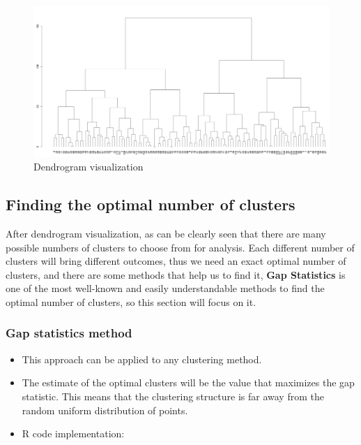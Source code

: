    \begin{figure}[H]
        \centering
        \includegraphics[scale=0.3]{graphics/dummy/dendrogram/dendrogram1.png}
        \caption{Dendrogram visualization }
    \end{figure} 

\subsection{Finding the optimal number of clusters}
 After dendrogram visualization, as can be clearly seen that there are many possible numbers of clusters to choose from for analysis. Each different number of clusters will bring different outcomes, thus we need an exact optimal number of clusters, and there are some methods that help us to find it, \textbf{Gap Statistics} is one of the most well-known and easily understandable methods to find the optimal number of clusters, so this section will focus on it.
 
    \subsubsection{Gap statistics method}

    \begin{itemize}
        \item This approach can be applied to any clustering method.

        \item The estimate of the optimal clusters will be the value that maximizes the gap statistic. This means that the clustering structure is far away from the random uniform distribution of points.

        \item R code implementation:
    \end{itemize}

